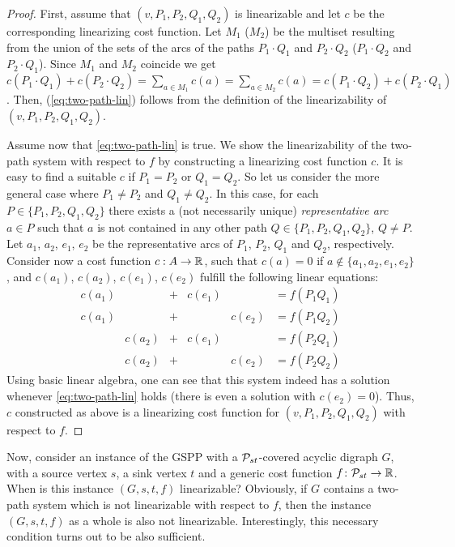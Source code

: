 \begin{proof}
    First, assume that $(v,P_1,P_2,Q_1,Q_2)$ is linearizable and let $c$ be the corresponding  linearizing cost function.  Let $M_1$ ($M_2$) be the multiset  resulting from   the union of the sets of the arcs of the paths $P_1\cdot Q_1$ and $P_2\cdot Q_2$  ($P_1\cdot Q_2$ and $P_2 \cdot Q_1$). Since $M_1$ and $M_2$ coincide we get   $c(P_1 \cdot Q_1) + c(P_2 \cdot Q_2) =\sum_{a\in M_1} c(a)= \sum_{a\in M_2} c(a)=c(P_1 \cdot Q_2) + c(P_2 \cdot Q_1)$. Then,   (\ref{eq:two-path-lin}) follows from the definition of the linearizability of   $(v,P_1,P_2,Q_1,Q_2)$.
    
    Assume now  that \cref{eq:two-path-lin} is true. We  show the linearizability of  the two-path system with respect to $f$ by constructing a linearizing cost function $c$.   It is easy to find a suitable  $c$ if $P_1=P_2$ or $Q_1=Q_2$. So let us consider  the more general case  where $P_1\neq P_2$ and $Q_1\neq Q_2$.  In this case, for   each  $P\in \{P_1,P_2,Q_1,Q_2\}$ there exists a (not necessarily unique) \emph{representative arc} $a\in P$ such that $a$  is not contained in any other path  $Q\in \{P_1,P_2,Q_1,Q_2\}$, $Q \neq P$. Let $a_1$, $a_2$, $e_1$, $e_2$ be the representative arcs of $P_1$, $P_2$, $Q_1$ and $Q_2$, respectively.  Consider now a cost function $c : A \rightarrow \mathbb{R}$, such that $c(a) = 0$ if  $a\not\in \{a_1, a_2, e_1, e_2\}$, and $c(a_1)$, $c(a_2)$, $c(e_1)$, 
$c(e_2)$ fulfill the following linear equations:
    \begin{equation*}
        \begin{array}{llcllcl}
        c(a_1) & & + & c(e_1) & & = f(P_1Q_1) \\
        c(a_1) & & + & & c(e_2) &= f(P_1Q_2) \\
        &c(a_2) & + & c(e_1) & &= f(P_2Q_1) \\
        &c(a_2) & + & & c(e_2) &= f(P_2Q_2) 
    \end{array}
    \end{equation*}
    Using basic linear algebra, one can see that this system indeed has a solution whenever  \cref{eq:two-path-lin} holds (there is even a solution with $c(e_2) = 0$). Thus, $c$ constructed as above is a linearizing  cost function for $(v,P_1,P_2,Q_1,Q_2)$ with respect to $f$. 
\end{proof}

Now, consider an instance of the GSPP with a $\mathcal{P}_{st}$-covered acyclic digraph $G$, with a  source vertex $s$, a sink vertex $t$ and a generic cost function $f\colon \mathcal{P}_{st}\to \mathbb{R}$. When is this instance $(G,s,t,f)$ linearizable? Obviously, if $G$ contains a two-path system which is not linearizable with respect to $f$, then the instance $(G,s,t,f)$ as a whole is also not linearizable. Interestingly, this necessary condition turns out to be also sufficient.

